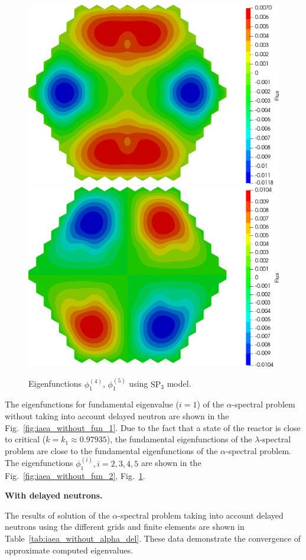 \documentclass[authoryear]{elsarticle}
\begin{document}
\begin{figure}[htp]
\begin{center}
	\includegraphics[width=0.49\linewidth]{iaea_without/alpha_sp3_u1_4_without.png}
	\includegraphics[width=0.49\linewidth]{iaea_without/alpha_sp3_u1_5_without.png}\\
	\caption{Eigenfunctions $\phi_1^{(4)}$, $\phi_1^{(5)}$ using $\mathrm{SP_3}$ model.}
	\label{fig:iaea_without_fun_3}
\end{center}
\end{figure}

The eigenfunctions for fundamental eigenvalue ($i=1$) of the $\alpha$-spectral problem without taking into account delayed neutron are shown in the Fig.~\ref{fig:iaea_without_fun_1}. 
Due to the fact that a state of the reactor is close to critical ($k=k_1\approx 0.97935$), the fundamental eigenfunctions of the $\lambda$-spectral problem are close to the fundamental eigenfunctions of the $\alpha$-spectral problem.
The eigenfunctions $\phi_1^{(i)}, i=2,3,4,5$ are shown in the Fig.~\ref{fig:iaea_without_fun_2}, Fig.~\ref{fig:iaea_without_fun_3}.

\textbf{With delayed neutrons.}

The results of solution of the $\alpha$-spectral problem taking into account delayed neutrons using the different grids and finite elements are shown in Table~\ref{tab:iaea_without_alpha_del}.
These data demonstrate the convergence of approximate computed eigenvalues.
\end{document}
